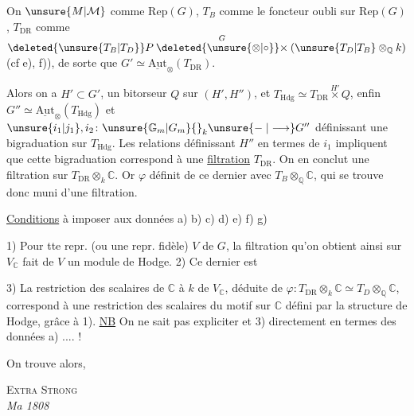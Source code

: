  On  $\unsure{M|\mathcal M}$ comme $\mathrm{Rep}(G)$, $T_B$  comme le foncteur oubli sur $\mathrm{Rep}(G)$, $T_{\mathrm{DR}}$ comme $\deleted{\unsure{T_B|T_D}}P\overset{G}{\deleted{\unsure{\otimes|\circ}}\times}(\unsure{T_D|T_B}\otimes_{\mathbb Q}k)$ (cf e), f)),  de sorte que $G'\simeq\underline{\mathrm{Aut}}_{\otimes}(T_{\mathrm{DR}})$.


Alors on a $H'\subset G'$, un bitorseur $Q$ sur $(H',H'')$,  et $T_{\mathrm{Hdg}}\simeq T_{\mathrm{DR}}\overset{H'}{\times}Q$, enfin  $G''\simeq\underline{\mathrm{Aut}}_{\otimes}(T_{\mathrm{Hdg}})$ et $\unsure{i_1|j_1},i_2\colon \unsure{\mathbb G_m|G_m}{}_{k}\unsure{\mathrel{-}|\longrightarrow}G''$ définissant une bigraduation sur $T_{\mathrm{Hdg}}$. Les relations  définissant $H''$ en termes de $i_1$ impliquent que cette bigraduation correspond à une  \uline{filtration}  $T_{\mathrm{DR}}$. On en conclut une filtration sur $T_{\mathrm{DR}}\otimes_k\mathbb C$. Or $\varphi$ définit   de ce dernier avec $T_B\otimes_{\mathbb Q}\mathbb C$, qui se trouve donc muni d'une filtration.

\uline{Conditions} à imposer aux données a) b) c) d) e) f) g)

 1) Pour tte repr. (ou une repr. fidèle) $V$ de $G$, la filtration qu'on obtient ainsi sur $V_{\mathbb C}$  fait de $V$ un module de Hodge. 2) Ce dernier est 

3) La restriction des scalaires de $\mathbb C$ à $k$ de $V_{\mathbb C}$, déduite de $\varphi\colon T_{\mathrm{DR}}\otimes_k\mathbb C\simeq T_D\otimes_{\mathbb Q}\mathbb C$, correspond à une restriction des scalaires du motif sur $\mathbb C$ défini par la structure de Hodge, grâce à 1). \uline{NB} On ne sait pas expliciter  et 3)  directement en termes des données a) .... !

On trouve alors,  
{\centering \textsc{Extra Strong}\\
\textit{Ma 1808}\par}
